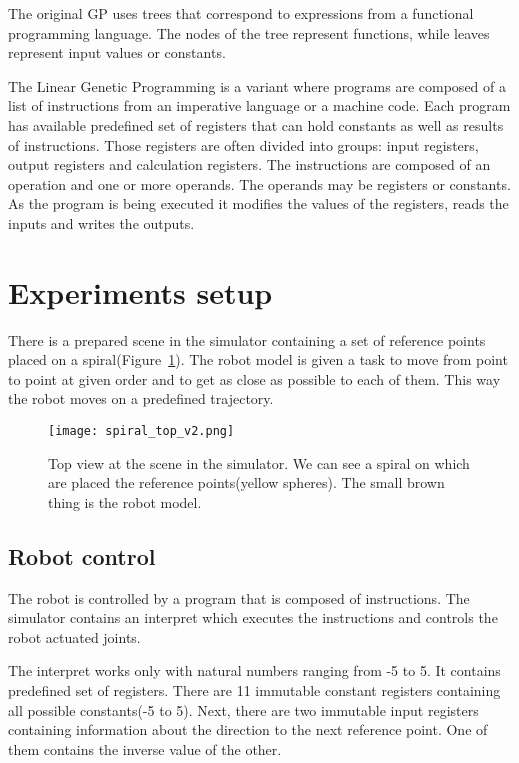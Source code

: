 \documentclass{ExcelAtFIT}
\begin{document}
The original GP uses trees that correspond to expressions from a functional programming language.
The nodes of the tree represent functions, while leaves represent input values or constants.

The Linear Genetic Programming is a variant where programs are composed of a list of instructions from an imperative language or a machine code.
Each program has available predefined set of registers that can hold constants as well as results of instructions.
Those registers are often divided into groups: input registers, output registers and calculation registers.
The instructions are composed of an operation and one or more operands.
The operands may be registers or constants.
As the program is being executed it modifies the values of the registers, reads the inputs and writes the outputs.


\section{Experiments setup}
\label{sec:ExperimentsSetup}
There is a prepared scene in the simulator containing a set of reference points placed on a spiral(Figure~\ref{fig:SpiralTop}).
The robot model is given a task to move from point to point at given order and to get as close as possible to each of them.
This way the robot moves on a predefined trajectory.

\begin{figure}[t]
\centering
{\texttt{[image: spiral\_top\_v2.png]}}
\caption{Top view at the scene in the simulator.
We can see a spiral on which are placed the reference points(yellow spheres).
The small brown thing is the robot model.}
\label{fig:SpiralTop}
\end{figure}


\subsection{Robot control}
The robot is controlled by a program that is composed of instructions.
The simulator contains an interpret which executes the instructions and controls the robot actuated joints.

The interpret works only with natural numbers ranging from -5 to 5.
It contains predefined set of registers.
There are 11 immutable constant registers containing all possible constants(-5 to 5).
Next, there are two immutable input registers containing information about the direction to the next reference point. 
One of them contains the inverse value of the other.
\end{document}

